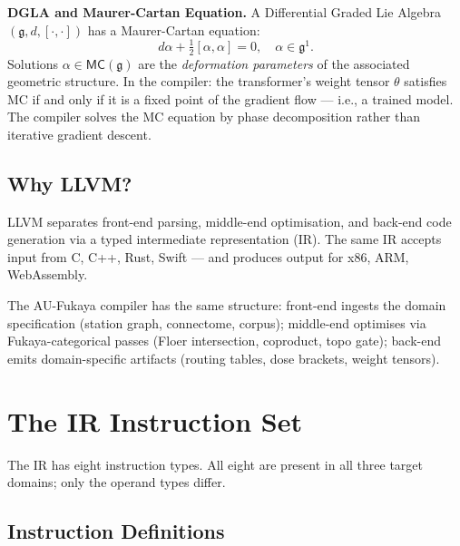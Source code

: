 \documentclass[11pt]{amsart}
\newcommand{\MC}{\mathsf{MC}}
\begin{document}
\textbf{DGLA and Maurer-Cartan Equation.}
A Differential Graded Lie Algebra $(\mathfrak{g}, d, [\cdot,\cdot])$
has a Maurer-Cartan equation:
\[
  d\alpha + \tfrac{1}{2}[\alpha,\alpha] = 0, \quad \alpha \in \mathfrak{g}^1.
\]
Solutions $\alpha \in \MC(\mathfrak{g})$ are the \emph{deformation parameters}
of the associated geometric structure.
In the compiler: the transformer's weight tensor $\theta$ satisfies MC
if and only if it is a fixed point of the gradient flow ---
i.e., a trained model. The compiler solves the MC equation
by phase decomposition rather than iterative gradient descent.

\subsection{Why LLVM?}

LLVM separates front-end parsing, middle-end optimisation, and
back-end code generation via a typed intermediate representation (IR).
The same IR accepts input from C, C++, Rust, Swift --- and produces
output for x86, ARM, WebAssembly.

The AU-Fukaya compiler has the same structure:
front-end ingests the domain specification
(station graph, connectome, corpus);
middle-end optimises via Fukaya-categorical passes
(Floer intersection, coproduct, topo gate);
back-end emits domain-specific artifacts
(routing tables, dose brackets, weight tensors).

\section{The IR Instruction Set}

The IR has eight instruction types.
All eight are present in all three target domains;
only the operand types differ.

\subsection{Instruction Definitions}
\end{document}
